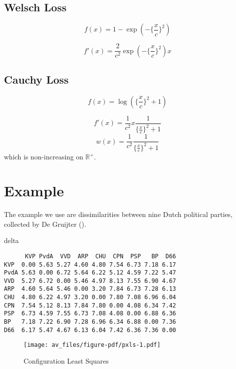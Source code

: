 \documentclass[
  12pt,
  letterpaper,
  DIV=11,
  numbers=noendperiod]{scrartcl}
\newenvironment{Shaded}{\begin{snugshade}}{\end{snugshade}}
\newcommand{\NormalTok}[1]{\textcolor[rgb]{0.00,0.23,0.31}{#1}}
\newcommand{\sectionbreak}{\pagebreak}
\begin{document}
\subsection{Welsch Loss}\label{welsch-loss}

\[
f(x)=1-\exp(-\{\frac{x}{c}\}^2)
\]

\[
f'(x)=\frac{2}{c^2}\exp(-\{\frac{x}{c}\}^2)x
\]

\subsection{Cauchy Loss}\label{cauchy-loss}

\[
f(x)=\log(\{\frac{x}{c}\}^2+1)
\]

\[
f'(x)=\frac{1}{c^2}x\frac{1}{\{\frac{x}{c}\}^2+1}
\] \[
w(x)=\frac{1}{c^2}\frac{1}{\{\frac{x}{c}\}^2+1}
\] which is non-increasing on \(\mathbb{R}^+\).

\sectionbreak

\section{Example}\label{example}

The example we use are dissimilarities between nine Dutch political
parties, collected by De Gruijter ().

\begin{Shaded}
\begin{Highlighting}[]
\NormalTok{delta}
\end{Highlighting}
\end{Shaded}

\begin{verbatim}
      KVP PvdA  VVD  ARP  CHU  CPN  PSP   BP  D66
KVP  0.00 5.63 5.27 4.60 4.80 7.54 6.73 7.18 6.17
PvdA 5.63 0.00 6.72 5.64 6.22 5.12 4.59 7.22 5.47
VVD  5.27 6.72 0.00 5.46 4.97 8.13 7.55 6.90 4.67
ARP  4.60 5.64 5.46 0.00 3.20 7.84 6.73 7.28 6.13
CHU  4.80 6.22 4.97 3.20 0.00 7.80 7.08 6.96 6.04
CPN  7.54 5.12 8.13 7.84 7.80 0.00 4.08 6.34 7.42
PSP  6.73 4.59 7.55 6.73 7.08 4.08 0.00 6.88 6.36
BP   7.18 7.22 6.90 7.28 6.96 6.34 6.88 0.00 7.36
D66  6.17 5.47 4.67 6.13 6.04 7.42 6.36 7.36 0.00
\end{verbatim}

\begin{figure}[H]

{\centering \texttt{[image: av\_files/figure-pdf/pxls-1.pdf]}

}

\caption{Configuration Least Squares}

\end{figure}%
\end{document}
